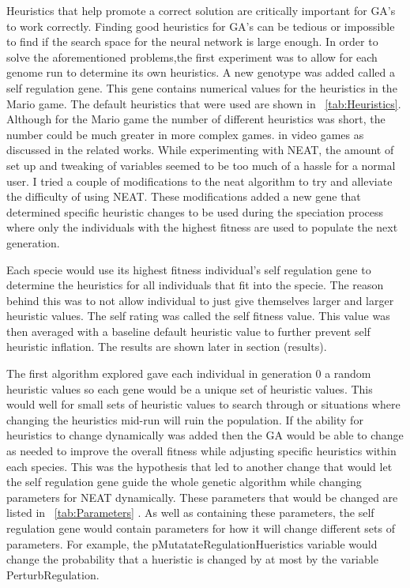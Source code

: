 \documentclass[12pt]{ucthesis} \newif\ifpdf \ifx\pdfoutput\undefined
\begin{document}
Heuristics that help promote a correct solution are critically important for
GA’s to work correctly. Finding good heuristics for GA’s can be tedious or
impossible to find if the search space for the neural network is large enough.
In order to solve the aforementioned problems,the first experiment was to allow
for each genome run to determine its own heuristics.  A new genotype was added
called a self regulation gene. This gene contains numerical values for the
heuristics in the Mario game. The default heuristics that were used are shown in
~\ref{tab:Heuristics}. Although for the Mario game the number of different
heuristics was short, the number could be much greater in more complex games. in
video games as discussed in the related works. While experimenting with NEAT,
the amount of set up and tweaking of variables seemed to be too much of a hassle
for a normal user.  I tried a couple of modifications to the neat algorithm to
try and alleviate the difficulty of using NEAT.  These modifications added a new
gene that determined specific heuristic changes to be used during the speciation
process where only the individuals with the highest fitness are used to populate
the next generation.

Each specie would use its highest fitness individual’s self regulation gene to
determine the heuristics for all individuals that fit into the specie. The
reason behind this was to not allow individual to just give themselves larger
and larger heuristic values. The self rating was called the self fitness value.
This value was then averaged with a baseline default heuristic value to further
prevent self heuristic inflation. The results are shown later in section
(results).

The first algorithm explored gave each individual in generation 0 a random
heuristic values so each gene would be a unique set of heuristic values. This
would well for small sets of heuristic values to search through or situations
where changing the heuristics mid-run will ruin the population. If the ability
for heuristics to change dynamically was added then the GA would be able to
change as needed to improve the overall fitness while adjusting specific
heuristics within each species. This was the hypothesis that led to another
change that would let the self regulation gene guide the whole genetic algorithm
while changing parameters for NEAT dynamically. These parameters that would be
changed are listed in ~\ref{tab:Parameters} . As well as containing these
parameters, the self regulation gene would contain parameters for how it will
change different sets of parameters. For example, the
pMutatateRegulationHueristics variable would change the probability that a
hueristic is changed by at most by the variable PerturbRegulation.
\end{document}
